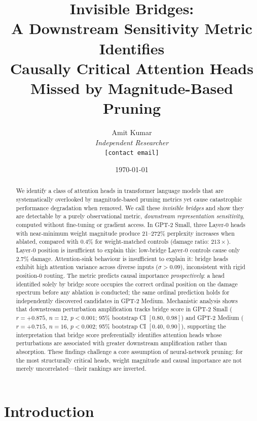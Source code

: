 \documentclass[11pt,a4paper]{article}
\title{%
    \LARGE\textbf{Invisible Bridges:}\\[4pt]
    \Large A Downstream Sensitivity Metric Identifies\\
    Causally Critical Attention Heads\\
    Missed by Magnitude-Based Pruning%
}
\author{%
    Amit Kumar\\[2pt]
    \small\textit{Independent Researcher}\\
    \small\texttt{[contact email]}%
}
\date{\today}
\theoremstyle{definition}
\theoremstyle{plain}
\begin{document}
\maketitle
\thispagestyle{empty}

\begin{abstract}
\noindent
We identify a class of attention heads in transformer language models that
are systematically overlooked by magnitude-based pruning metrics yet cause
catastrophic performance degradation when removed.
We call these \emph{invisible bridges} and show they are detectable by a
purely observational metric, \emph{downstream representation
sensitivity}, computed without fine-tuning or gradient access.
%
In GPT-2 Small, three Layer-0 heads with near-minimum weight magnitude
produce 21--272\% perplexity increases when ablated, compared with 0.4\%
for weight-matched controls (damage ratio: $213\times$).
%
Layer-0 position is insufficient to explain this: low-bridge Layer-0 controls cause
only 2.7\% damage.
Attention-sink behaviour is insufficient to explain it: bridge heads
exhibit high attention variance across diverse inputs ($\sigma > 0.09$),
inconsistent with rigid position-0 routing.
%
The metric predicts causal importance \emph{prospectively}: a head
identified solely by bridge score occupies the correct ordinal position
on the damage spectrum before any ablation is conducted;
the same ordinal prediction holds for independently discovered candidates
in GPT-2 Medium.
%
Mechanistic analysis shows that downstream perturbation amplification
tracks bridge score in GPT-2 Small ($r=+0.875$, $n=12$,
$p<0.001$; 95\% bootstrap CI $[0.80,\, 0.98]$) and
GPT-2 Medium ($r=+0.715$, $n=16$, $p<0.002$;
95\% bootstrap CI $[0.40,\, 0.90]$), supporting the interpretation that
bridge score preferentially identifies attention heads whose perturbations
are associated with greater downstream amplification rather than absorption.
These findings challenge a core assumption of neural-network pruning:
for the most structurally critical heads, weight magnitude and causal
importance are not merely uncorrelated---their rankings are inverted.
\end{abstract}

\newpage
\setcounter{page}{1}
\tableofcontents
\vspace{1em}

\section{Introduction}
\label{sec:intro}
\end{document}
